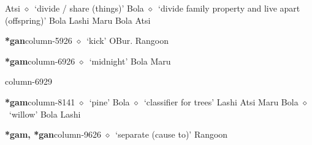 \hspace{1ex}
         Atsi 
\hspace{1ex}
         $\diamond$~`divide / share (things)'
         Bola 
\hspace{1ex}
         $\diamond$~`divide family property and live apart (offspring)'
         Bola 
\hspace{1ex}
         Lashi 
\hspace{1ex}
         Maru 
\hspace{1ex}
         Bola 
\hspace{1ex}
         Atsi 
  \item {\footnotesize \textbf{*gan}}{\tiny column-5926}
         $\diamond$~`kick'
         OBur. 
\hspace{1ex}
         Rangoon 
  \item {\footnotesize \textbf{*gam}}{\tiny column-6926}
         $\diamond$~`midnight'
         Bola 
\hspace{1ex}
         Maru 
  \item {\footnotesize \textbf{}}{\tiny column-6929}
  \item {\footnotesize \textbf{*gam}}{\tiny column-8141}
         $\diamond$~`pine'
         Bola 
\hspace{1ex}
         $\diamond$~`classifier for trees'
         Lashi 
\hspace{1ex}
         Atsi 
\hspace{1ex}
         Maru 
\hspace{1ex}
         Bola 
\hspace{1ex}
         $\diamond$~`willow'
         Bola 
\hspace{1ex}
         Lashi 
  \item {\footnotesize \textbf{*gam, *gan}}{\tiny column-9626}
         $\diamond$~`separate (cause to)'
         Rangoon 
